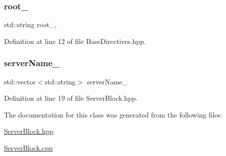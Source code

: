 \mbox{\label{classft_1_1_base_directives_abb1eaf0bba10b90172d6152e69457dc7}} 
\subsubsection{\texorpdfstring{root\+\_\+}{root\_}}
{\footnotesize\ttfamily std\+::string root\+\_\+\hspace{0.3cm}{\ttfamily [protected]}, {\ttfamily [inherited]}}



Definition at line 12 of file Base\+Directives.\+hpp.

\mbox{\label{classft_1_1_server_block_adc26ae834350b4c964d4198e7a431e90}} 
\subsubsection{\texorpdfstring{server\+Name\+\_\+}{serverName\_}}
{\footnotesize\ttfamily std\+::vector$<$std\+::string$>$ server\+Name\+\_\+\hspace{0.3cm}{\ttfamily [private]}}



Definition at line 19 of file Server\+Block.\+hpp.



The documentation for this class was generated from the following files\+:\begin{DoxyCompactItemize}
\item 
\hyperlink{_server_block_8hpp}{Server\+Block.\+hpp}\item 
\hyperlink{_server_block_8cpp}{Server\+Block.\+cpp}\end{DoxyCompactItemize}
